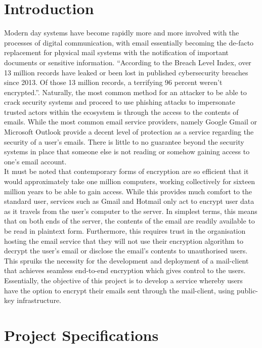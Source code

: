 \documentclass[12pt]{article}
\begin{document}
	\section{Introduction}
		Modern day systems have become rapidly more and more involved with the processes of digital communication, with email essentially becoming the de-facto replacement for physical mail systems with the notification of important documents or sensitive information. ``According to the Breach Level Index, over 13 million records have leaked or been lost in published cybersecurity breaches since 2013. Of those 13 million records, a terrifying 96 percent weren't encrypted.''\cite{zapierSecure}. Naturally, the most common method for an attacker to be able to crack security systems and proceed to use phishing attacks to impersonate trusted actors within the ecosystem is through the access to the contents of emails. While the most common email service providers, namely Google Gmail or Microsoft Outlook provide a decent level of protection as a service regarding the security of a user's emails. There is little to no guarantee beyond the security systems in place that someone else is not reading or somehow gaining access to one's email account.\\
		\newline
		\noindent It must be noted that contemporary forms of encryption are so efficient that it would approximately take one million computers, working collectively for sixteen million years\cite{encryptionStrength} to be able to gain access. While this provides much comfort to the standard user, services such as Gmail and Hotmail only act to encrypt user data as it travels from the user's computer to the server. In simplest terms, this means that on both ends of the server, the contents of the email are readily available to be read in plaintext form. Furthermore, this requires trust in the organisation hosting the email service that they will not use their encryption algorithm to decrypt the user's email or disclose the email's contents to unauthorised users.\\
		\newline
		\noindent This spruiks the necessity for the development and deployment of a mail-client that achieves seamless end-to-end encryption which gives control to the users. Essentially, the objective of this project is to develop a service whereby users have the option to encrypt their emails sent through the mail-client, using public-key infrastructure. 
\section{Project Specifications}
\end{document}
